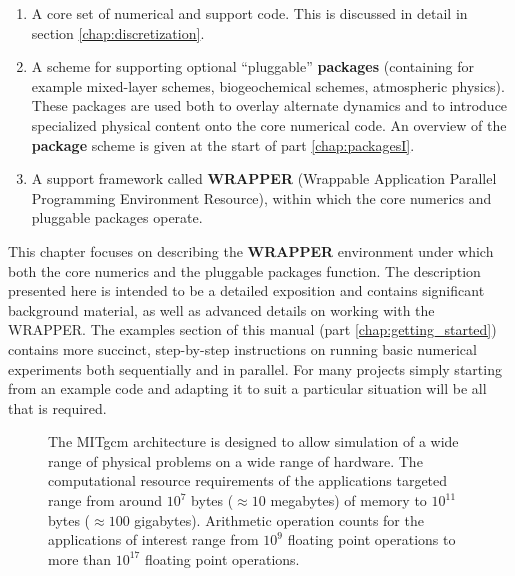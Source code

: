 \begin{enumerate}
\item A core set of numerical and support code. This is discussed in
  detail in section \ref{chap:discretization}.

\item A scheme for supporting optional ``pluggable'' {\bf packages}
  (containing for example mixed-layer schemes, biogeochemical schemes,
  atmospheric physics).  These packages are used both to overlay
  alternate dynamics and to introduce specialized physical content
  onto the core numerical code. An overview of the {\bf package}
  scheme is given at the start of part \ref{chap:packagesI}.

\item A support framework called {\bf WRAPPER} (Wrappable Application
  Parallel Programming Environment Resource), within which the core
  numerics and pluggable packages operate.
\end{enumerate}

This chapter focuses on describing the {\bf WRAPPER} environment under
which both the core numerics and the pluggable packages function. The
description presented here is intended to be a detailed exposition and
contains significant background material, as well as advanced details
on working with the WRAPPER.  The examples section of this manual
(part \ref{chap:getting_started}) contains more succinct, step-by-step
instructions on running basic numerical experiments both sequentially
and in parallel. For many projects simply starting from an example
code and adapting it to suit a particular situation will be all that
is required.


\begin{figure}
\begin{center}
\end{center}
\caption{ The MITgcm architecture is designed to allow simulation of a
  wide range of physical problems on a wide range of hardware. The
  computational resource requirements of the applications targeted
  range from around $10^7$ bytes ($\approx 10$ megabytes) of memory to
  $10^{11}$ bytes ($\approx 100$ gigabytes). Arithmetic operation
  counts for the applications of interest range from $10^{9}$ floating
  point operations to more than $10^{17}$ floating point operations.}
\label{fig:mitgcm_architecture_goals}
\end{figure}

